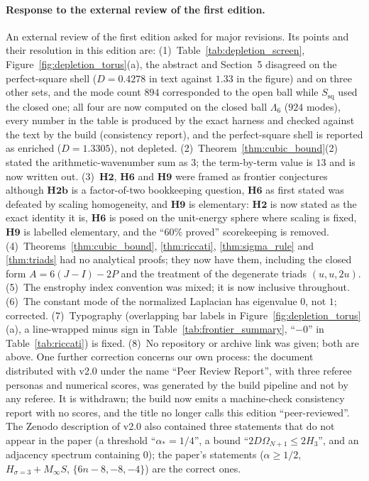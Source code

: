 \documentclass[11pt,a4paper]{article}
\theoremstyle{definition}
\theoremstyle{remark}
\begin{document}
\paragraph{Response to the external review of the first edition.}
An external review of the first edition asked for major revisions. Its points and their resolution in this edition are: (1)~Table~\ref{tab:depletion_screen}, Figure~\ref{fig:depletion_torus}(a), the abstract and Section~5 disagreed on the perfect-square shell ($D=0.4278$ in text against $1.33$ in the figure) and on three other sets, and the mode count $894$ corresponded to the open ball while $S_{\mathrm{sq}}$ used the closed one; all four are now computed on the closed ball $\Lambda_6$ ($924$ modes), every number in the table is produced by the exact harness and checked against the text by the build (consistency report), and the perfect-square shell is reported as enriched ($D=1.3305$), not depleted. (2)~Theorem~\ref{thm:cubic_bound}(2) stated the arithmetic-wavenumber sum as $3$; the term-by-term value is $13$ and is now written out. (3)~$\mathbf{H2}$, $\mathbf{H6}$ and $\mathbf{H9}$ were framed as frontier conjectures although $\mathbf{H2b}$ is a factor-of-two bookkeeping question, $\mathbf{H6}$ as first stated was defeated by scaling homogeneity, and $\mathbf{H9}$ is elementary: $\mathbf{H2}$ is now stated as the exact identity it is, $\mathbf{H6}$ is posed on the unit-energy sphere where scaling is fixed, $\mathbf{H9}$ is labelled elementary, and the ``$60\%$ proved'' scorekeeping is removed. (4)~Theorems~\ref{thm:cubic_bound}, \ref{thm:riccati}, \ref{thm:sigma_rule} and \ref{thm:triads} had no analytical proofs; they now have them, including the closed form $A=6(J-I)-2P$ and the treatment of the degenerate triads $(u,u,2u)$. (5)~The enstrophy index convention was mixed; it is now inclusive throughout. (6)~The constant mode of the normalized Laplacian has eigenvalue $0$, not $1$; corrected. (7)~Typography (overlapping bar labels in Figure~\ref{fig:depletion_torus}(a), a line-wrapped minus sign in Table~\ref{tab:frontier_summary}, ``$-0$'' in Table~\ref{tab:riccati}) is fixed. (8)~No repository or archive link was given; both are above. One further correction concerns our own process: the document distributed with v2.0 under the name ``Peer Review Report'', with three referee personas and numerical scores, was generated by the build pipeline and not by any referee. It is withdrawn; the build now emits a machine-check consistency report with no scores, and the title no longer calls this edition ``peer-reviewed''. The Zenodo description of v2.0 also contained three statements that do not appear in the paper (a threshold ``$\alpha_*=1/4$'', a bound ``$2D\Omega_{N+1}\le 2H_3$'', and an adjacency spectrum containing $0$); the paper's statements ($\alpha\ge 1/2$, $H_{\sigma=3}+M_\infty S$, $\{6n-8,-8,-4\}$) are the correct ones.
\end{document}
